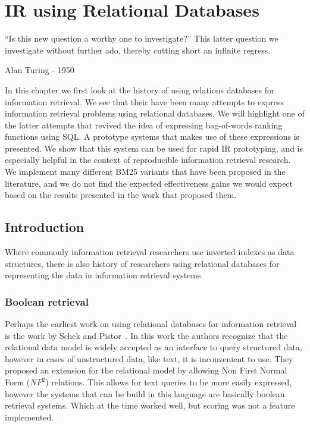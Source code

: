 \chapter{IR using Relational Databases}
\label{ir-using-relational-databases}
\epigraph{``Is this new question a worthy one to investigate?'' This latter question we investigate without further ado, thereby cutting short an infinite regress.}{Alan Turing - 1950}

\begin{Abstract}
\begin{changemargin}{1cm}{1cm}
	In this chapter we first look at the history of using relations databases for information retrieval. We see that their have been many attempts to express information retrieval problems using relational databases. We will highlight one of the latter attempts that revived the idea of expressing bag-of-words ranking functions using SQL. A prototype systems that makes use of these expressions is presented. We show that this system can be used for rapid IR prototyping, and is especially helpful in the context of reproducible information retrieval research.
	We implement many different BM25 variants that have been proposed in the literature, and we do not find the expected effectiveness gains we would expect based on the results presented in the work that proposed them.  
\end{changemargin}
\end{Abstract}


\section{Introduction}
Where commonly information retrieval researchers use inverted indexes as data structures, there is also history of researchers using relational databases for representing the data in information retrieval systems.

\subsection{Boolean retrieval}
Perhaps the earliest work on using relational databases for information retrieval is the work by Schek and Pistor~\cite{SchekPistor}. In this work the authors recognize that the relational data model is widely accepted as an interface to query structured data, however in cases of unstructured data, like text, it is inconvenient to use. They proposed an extension for the relational model by allowing Non First Normal Form ($NF^2$) relations. This allows for text queries to be more easily expressed, however the systems that can be build in this language are basically boolean retrieval systems. Which at the time worked well, but scoring was not a feature implemented.  

